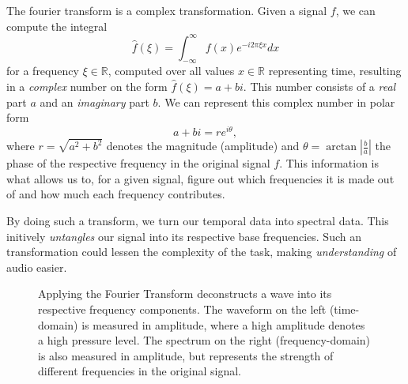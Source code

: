 The fourier transform is a complex transformation. Given a signal $f$, we can compute the integral \[ \widehat{f}(\xi) = \int^{\infty}_{-\infty}{f(x)e^{-i2\pi \xi x} dx} \] for a frequency $\xi \in \mathbb{R}$, computed over all values $x \in \mathbb{R}$ representing time, resulting in a \textit{complex} number on the form $\widehat{f}(\xi) = a + bi$. This number consists of a \textit{real} part $a$ and an \textit{imaginary} part $b$. We can represent this complex number in polar form \[ a + bi = re^{i\theta}, \] where $r = \sqrt{a^2 + b^2}$ denotes the magnitude (amplitude) and $\theta = \arctan{|\frac{b}{a}|}$ the phase of the respective frequency in the original signal $f$. This information is what allows us to, for a given signal, figure out which frequencies it is made out of and how much each frequency contributes. 

By doing such a transform, we turn our temporal data into spectral data. This initively \textit{untangles} our signal into its respective base frequencies. Such an transformation could lessen the complexity of the task, making \textit{understanding} of audio easier.

\begin{figure}[H]
    \centering
    \hspace*{-1.3cm}
    \caption{Applying the Fourier Transform deconstructs a wave into its respective frequency components. The waveform on the left (time-domain) is measured in amplitude, where a high amplitude denotes a high pressure level. The spectrum on the right (frequency-domain) is also measured in amplitude, but represents the strength of different frequencies in the original signal.}
    \label{FTFigure}
\end{figure}

